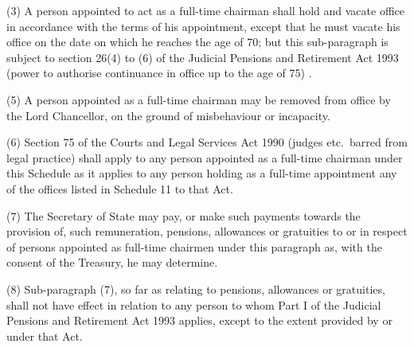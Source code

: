 \documentclass[12pt,a4paper]{article}
\begin{document}
(3) A person appointed to act as a full-time chairman shall hold and vacate office in accordance with the terms of his appointment, except that he must vacate his office 
on the date on which he reaches the age of 70; but this sub-paragraph is subject to section 26(4) to (6) of the Judicial Pensions and Retirement Act 1993 (power to authorise continuance in office up to the age of 75)%
.


(5) A person appointed as a full-time chairman may be removed from office by the Lord Chancellor, on the ground of misbehaviour or incapacity.

(6) Section 75 of the Courts and Legal Services Act 1990 (judges etc.\ barred from legal practice) shall apply to any person appointed as a full-time chairman under this Schedule as it applies to any person holding as a full-time appointment any of the offices listed in Schedule 11 to that Act.

(7) The Secretary of State may pay, or make such payments towards the provision of, such remuneration, pensions, allowances or gratuities to or in respect of persons appointed as full-time chairmen under this paragraph as, with the consent of the Treasury, he may determine.

(8) Sub-paragraph (7), so far as relating to pensions, allowances or gratuities, shall not have effect in relation to any person to whom Part I of the Judicial Pensions and Retirement Act 1993 applies, except to the extent provided by or under that Act.

\end{document}
